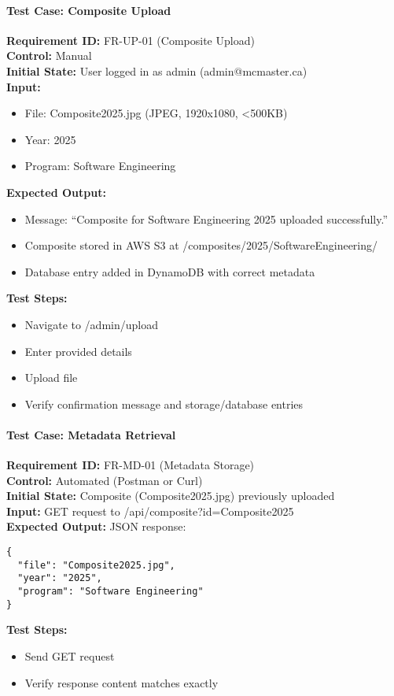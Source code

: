\documentclass[12pt, titlepage]{article}
\begin{document}
\paragraph{Test Case: Composite Upload}
\textbf{Requirement ID:} FR-UP-01 (Composite Upload) \\
\textbf{Control:} Manual \\
\textbf{Initial State:} User logged in as admin (admin@mcmaster.ca) \\
\textbf{Input:}
\begin{itemize}
    \item File: Composite2025.jpg (JPEG, 1920x1080, <500KB)
    \item Year: 2025
    \item Program: Software Engineering
\end{itemize}
\textbf{Expected Output:}
\begin{itemize}
    \item Message: ``Composite for Software Engineering 2025 uploaded successfully.''
    \item Composite stored in AWS S3 at /composites/2025/SoftwareEngineering/
    \item Database entry added in DynamoDB with correct metadata
\end{itemize}
\textbf{Test Steps:}
\begin{itemize}
    \item Navigate to /admin/upload
    \item Enter provided details
    \item Upload file
    \item Verify confirmation message and storage/database entries
\end{itemize}

\paragraph{Test Case: Metadata Retrieval}
\textbf{Requirement ID:} FR-MD-01 (Metadata Storage) \\
\textbf{Control:} Automated (Postman or Curl) \\
\textbf{Initial State:} Composite (Composite2025.jpg) previously uploaded \\
\textbf{Input:} GET request to /api/composite?id=Composite2025 \\
\textbf{Expected Output:} JSON response:
\begin{verbatim}
{
  "file": "Composite2025.jpg",
  "year": "2025",
  "program": "Software Engineering"
}
\end{verbatim}
\textbf{Test Steps:}
\begin{itemize}
    \item Send GET request
    \item Verify response content matches exactly
\end{itemize}
\end{document}
